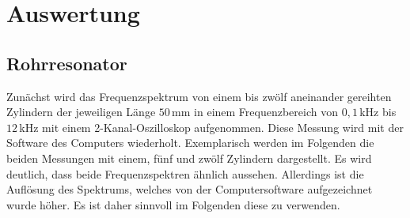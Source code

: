 \section{Auswertung}
\subsection{Rohrresonator}
Zunächst wird das Frequenzspektrum von einem bis zwölf aneinander gereihten Zylindern der jeweiligen Länge $50\,$mm
in einem Frequenzbereich von $0,1\,$kHz bis $12\,$kHz mit einem 2-Kanal-Oszilloskop aufgenommen.
Diese Messung wird mit der Software des Computers wiederholt.
Exemplarisch werden im Folgenden die beiden Messungen mit einem, fünf und zwölf Zylindern dargestellt.
Es wird deutlich, dass beide Frequenzspektren ähnlich aussehen. Allerdings ist die Auflösung 
des Spektrums, welches von der Computersoftware aufgezeichnet wurde höher. Es ist daher sinnvoll im Folgenden
diese zu verwenden.

